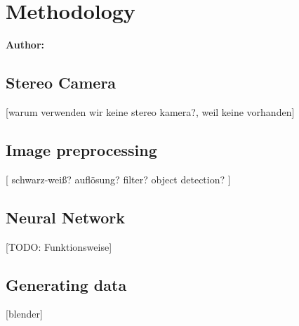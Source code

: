 \chapter{Methodology}

\textbf{Author: } 

\section{Stereo Camera}
[warum verwenden wir keine stereo kamera?, weil keine vorhanden]

\section{Image preprocessing}
[
schwarz-weiß?
auflösung?
filter?
object detection?
]

\section{Neural Network}
[TODO: Funktionsweise]

\section{Generating data}
[blender]


\filbreak